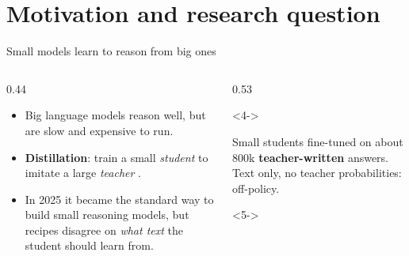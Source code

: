 \renewcommand{\sectioninfo}{Presenter: T3 \quad $\cdot$ \quad 6 minutes}
\section{Motivation and research question}

\begin{frame}{Small models learn to reason from big ones\hfill\est\ }
  \begin{columns}[T]
    \begin{column}{0.44\textwidth}
      \begin{itemize}
        \item<1-> Big language models reason well, but are slow and
              expensive to run.
        \item<2-> \textbf{Distillation}: train a small \emph{student} to
              imitate a large \emph{teacher} .
        \item<3-> In 2025 it became the standard way to build small
              reasoning models, but recipes disagree on \emph{what text}
              the student should learn from.
      \end{itemize}
    \end{column}
    \begin{column}{0.53\textwidth}
      \footnotesize
      \begin{uncoverenv}<4->
      \begin{tcolorbox}[enhanced,colback=white,colframe=kdblue,boxrule=0.5pt,arc=2pt,
          left=4pt,right=4pt,top=2pt,bottom=2pt,title={DeepSeek-R1 (2025)},
          fonttitle=\bfseries\scriptsize,colbacktitle=kdblue]
        Small students fine-tuned on about 800k \textbf{teacher-written}
        answers. Text only, no teacher probabilities: off-policy.
      \end{tcolorbox}
      \end{uncoverenv}
      \vspace{-0.1cm}
      \begin{uncoverenv}<5->
      \begin{tcolorbox}[enhanced,colback=white,colframe=kdteal,boxrule=0.5pt,arc=2pt,
          left=4pt,right=4pt,top=2pt,bottom=2pt,title={Qwen3 (2025)},
          fonttitle=\bfseries\scriptsize,colbacktitle=kdteal]

\end{tcolorbox}
\end{uncoverenv}
\end{column}
\end{columns}
\end{frame}
